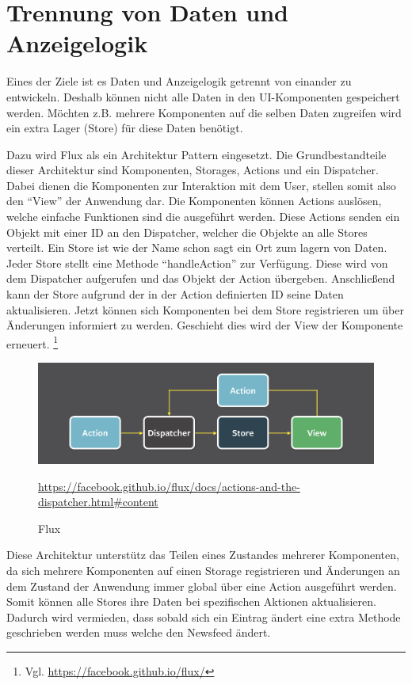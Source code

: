 \section{Trennung von Daten und Anzeigelogik}
Eines der Ziele ist es Daten und Anzeigelogik getrennt von einander zu entwickeln. 
Deshalb können nicht alle Daten in den UI-Komponenten gespeichert werden. Möchten z.B. mehrere Komponenten auf die selben 
Daten zugreifen wird ein extra Lager (Store) für diese Daten benötigt.

Dazu wird Flux als ein Architektur Pattern eingesetzt.
Die Grundbestandteile dieser Architektur sind Komponenten, Storages, Actions und ein Dispatcher.
Dabei dienen die Komponenten zur Interaktion mit dem User, stellen somit also den \enquote{View} der Anwendung dar.
Die Komponenten können Actions auslösen, welche einfache Funktionen sind die ausgeführt werden.
Diese Actions senden ein Objekt mit einer ID an den Dispatcher, welcher die Objekte an alle Stores verteilt.
Ein Store ist wie der Name schon sagt ein Ort zum lagern von Daten. Jeder Store stellt eine Methode \enquote{handleAction} zur Verfügung.
Diese wird von dem Dispatcher aufgerufen und das Objekt der Action übergeben. 
Anschließend kann der Store aufgrund der in der Action definierten ID seine Daten aktualisieren.
Jetzt können sich Komponenten bei dem Store registrieren um über Änderungen informiert zu werden.
Geschieht dies wird der View der Komponente erneuert. \footnote{Vgl. \url{https://facebook.github.io/flux/}}
\begin{figure}[H]
    \includegraphics[width=\textwidth]{images/flux.png}
    \caption{Flux}
    \url{https://facebook.github.io/flux/docs/actions-and-the-dispatcher.html#content}
\end{figure}

Diese Architektur unterstütz das Teilen eines Zustandes mehrerer Komponenten, da sich mehrere Komponenten auf einen Storage registrieren 
und Änderungen an dem Zustand der Anwendung immer global über eine Action ausgeführt werden. Somit können alle Stores ihre Daten bei spezifischen Aktionen aktualisieren.
Dadurch wird vermieden, dass sobald sich ein Eintrag ändert eine extra Methode geschrieben werden muss welche den Newsfeed ändert.

